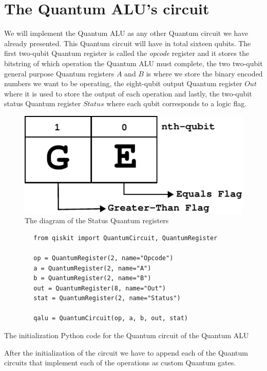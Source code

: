 \section{The Quantum ALU's circuit}

We will implement the Quantum ALU as any other Quantum circuit we have already presented. This Quantum circuit will have
in total sixteen qubits. The first two-qubit Quantum register is called the \textit{opcode} register and it stores the bitstring
of which operation the Quantum ALU must complete, the two two-qubit general purpose Quantum registers $A$ and $B$ is where
we store the binary encoded numbers we want to be operating, the eight-qubit output Quantum register $Out$ where it is used to
store the output of each operation and lastly, the two-qubit status Quantum register $Status$ where each qubit corresponds to
a logic flag.

\begin{figure}[ht]
    \centering
    \includegraphics[scale=0.8]{images/6_Complete_System/status_reg_diagram.pdf}
    \caption{The diagram of the Status Quantum registers}
\end{figure}

\begin{listing}[ht]
    \centering
    \begin{verbatim}
        from qiskit import QuantumCircuit, QuantumRegister

        op = QuantumRegister(2, name="Opcode")
        a = QuantumRegister(2, name="A")
        b = QuantumRegister(2, name="B")
        out = QuantumRegister(8, name="Out")
        stat = QuantumRegister(2, name="Status")

        qalu = QuantumCircuit(op, a, b, out, stat)
    \end{verbatim}
    \caption{The initialization Python code for the Quantum circuit of the Quantum ALU}
\end{listing}

After the initialization of the circuit we have to append each of the Quantum circuits that implement each of the operations
as custom Quantum gates.

